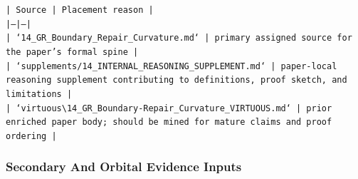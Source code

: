 \documentclass[11pt]{article}
\begin{document}
\noindent\texttt{| Source | Placement reason |}\\
\noindent\texttt{|---|---|}\\
\noindent\texttt{| `14\_GR\_Boundary\_Repair\_Curvature.md` | primary assigned source for the paper's formal spine |}\\
\noindent\texttt{| `supplements/14\_INTERNAL\_REASONING\_SUPPLEMENT.md` | paper-local reasoning supplement contributing to definitions, proof sketch, and limitations |}\\
\noindent\texttt{| `virtuous\textbackslash{}14\_GR\_Boundary-Repair\_Curvature\_VIRTUOUS.md` | prior enriched paper body; should be mined for mature claims and proof ordering |}\\

\subsubsection*{Secondary And Orbital Evidence Inputs}
\end{document}
